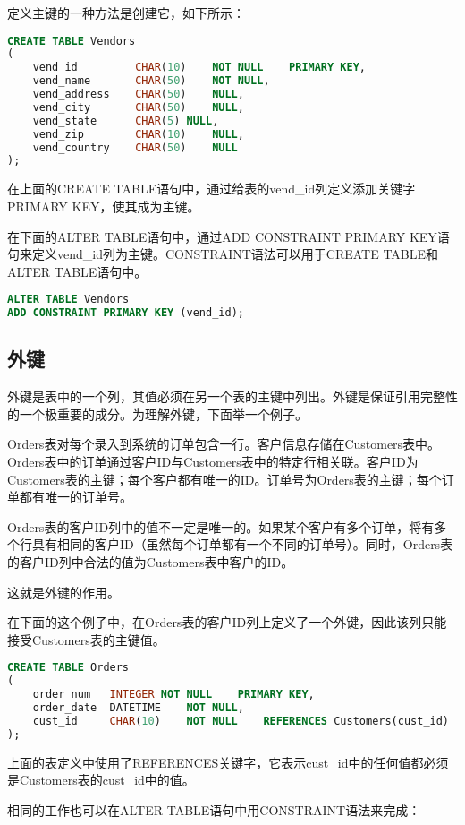 定义主键的一种方法是创建它，如下所示：


\begin{lstlisting}[language=SQL]
CREATE TABLE Vendors
(
	vend_id			CHAR(10)	NOT NULL	PRIMARY KEY,
	vend_name		CHAR(50)	NOT NULL,
	vend_address	CHAR(50)	NULL,
	vend_city		CHAR(50)	NULL,
	vend_state		CHAR(5)	NULL,
	vend_zip		CHAR(10)	NULL,
	vend_country	CHAR(50)	NULL
);
\end{lstlisting}


在上面的CREATE TABLE语句中，通过给表的vend\_id列定义添加关键字PRIMARY KEY，使其成为主键。

在下面的ALTER TABLE语句中，通过ADD CONSTRAINT PRIMARY KEY语句来定义vend\_id列为主键。CONSTRAINT语法可以用于CREATE TABLE和ALTER TABLE语句中。

\begin{lstlisting}[language=SQL]
ALTER TABLE Vendors
ADD CONSTRAINT PRIMARY KEY (vend_id);
\end{lstlisting}


\subsection{外键}


外键是表中的一个列，其值必须在另一个表的主键中列出。外键是保证引用完整性的一个极重要的成分。为理解外键，下面举一个例子。

Orders表对每个录入到系统的订单包含一行。客户信息存储在Customers表中。Orders表中的订单通过客户ID与Customers表中的特定行相关联。客户ID为Customers表的主键；每个客户都有唯一的ID。订单号为Orders表的主键；每个订单都有唯一的订单号。

Orders表的客户ID列中的值不一定是唯一的。如果某个客户有多个订单，将有多个行具有相同的客户ID（虽然每个订单都有一个不同的订单号）。同时，Orders表的客户ID列中合法的值为Customers表中客户的ID。

这就是外键的作用。

在下面的这个例子中，在Orders表的客户ID列上定义了一个外键，因此该列只能接受Customers表的主键值。

\begin{lstlisting}[language=SQL]
CREATE TABLE Orders
(
	order_num	INTEGER	NOT NULL	PRIMARY KEY,
	order_date	DATETIME	NOT NULL,
	cust_id		CHAR(10)	NOT NULL	REFERENCES Customers(cust_id)
);
\end{lstlisting}

上面的表定义中使用了REFERENCES关键字，它表示cust\_id中的任何值都必须是Customers表的cust\_id中的值。

相同的工作也可以在ALTER TABLE语句中用CONSTRAINT语法来完成：

